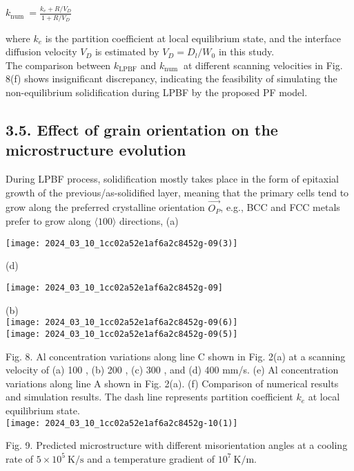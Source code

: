 \documentclass[10pt]{article}
\begin{document}
$k_{\text {num }}=\frac{k_{e}+R / V_{D}}{1+R / V_{D}}$

where $k_{e}$ is the partition coefficient at local equilibrium state, and the interface diffusion velocity $V_{D}$ is estimated by $V_{D}=D_{l} / W_{0}$ in this study.\\
The comparison between $k_{\mathrm{LPBF}}$ and $k_{\text {num }}$ at different scanning velocities in Fig. 8(f) shows insignificant discrepancy, indicating the feasibility of simulating the non-equilibrium solidification during LPBF by the proposed PF model.

\subsection*{3.5. Effect of grain orientation on the microstructure evolution}
During LPBF process, solidification mostly takes place in the form of epitaxial growth of the previous/as-solidified layer, meaning that the primary cells tend to grow along the preferred crystalline orientation $\overrightarrow{O_{P}}$, e.g., BCC and FCC metals prefer to grow along $\langle 100\rangle$ directions, (a)

\begin{center}
\texttt{[image: 2024\_03\_10\_1cc02a52e1af6a2c8452g-09(3)]}
\end{center}

(d)

\begin{center}
\texttt{[image: 2024\_03\_10\_1cc02a52e1af6a2c8452g-09]}
\end{center}

(b)\\
\texttt{[image: 2024\_03\_10\_1cc02a52e1af6a2c8452g-09(6)]}\\
\texttt{[image: 2024\_03\_10\_1cc02a52e1af6a2c8452g-09(5)]}

Fig. 8. Al concentration variations along line C shown in Fig. 2(a) at a scanning velocity of (a) 100 , (b) 200 , (c) 300 , and (d) 400 mm/s. (e) Al concentration variations along line A shown in Fig. 2(a). (f) Comparison of numerical results and simulation results. The dash line represents partition coefficient $k_{e}$ at local equilibrium state.\\
\texttt{[image: 2024\_03\_10\_1cc02a52e1af6a2c8452g-10(1)]}

Fig. 9. Predicted microstructure with different misorientation angles at a cooling rate of $5 \times 10^{5} \mathrm{~K} / \mathrm{s}$ and a temperature gradient of $10^{7} \mathrm{~K} / \mathrm{m}$.
\end{document}

